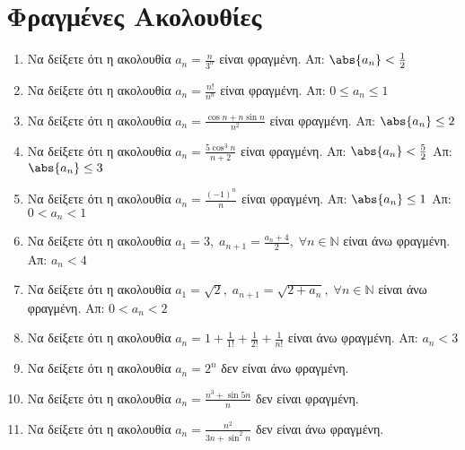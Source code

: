 


\everymath{\displaystyle}



\begin{center}
\end{center}

\vspace{\baselineskip}


\setcounter{chapter}{1}
\section{Φραγμένες Ακολουθίες}

\begin{enumerate}
    \item Να δείξετε ότι η ακολουθία $ a_{n} = \frac{n}{3^{n}} $ είναι 
        φραγμένη. 
        \hfill Απ: $ \abs{a_{n}}< \frac{1}{2} $
    \item Να δείξετε ότι η ακολουθία $ a_{n} = \frac{n!}{n^{n}} $ είναι 
        φραγμένη. 
        \hfill Απ: $ 0 \leq a_{n} \leq 1 $ 
    \item Να δείξετε ότι η ακολουθία $ a_{n} = \frac{\cos{n} + n 
        \sin{n}}{n^{2}} $ είναι φραγμένη. 
        \hfill Απ: $ \abs{a_{n}} \leq 2 $ 
    \item Να δείξετε ότι η ακολουθία $ a_{n} = \frac{5 \cos^{3}{n}}{n+2} $ 
        είναι φραγμένη.
        \hfill Απ: $ \abs{a_{n}} < \frac{5}{2}  $ 
        \hfill Απ: $ \abs{a_{n}} \leq 3 $ 
    \item Να δείξετε ότι η ακολουθία $ a_{n} = \frac{(-1)^{n}}{n} $ είναι 
        φραγμένη.
        \hfill Απ: $ \abs{a_{n}} \leq 1 $ 
        \hfill Απ: $ 0 < a_{n} < 1 $ 
    \item Να δείξετε ότι η ακολουθία $ a_{1} = 3, \; a_{n+1} =
        \frac{a_{n}+4}{2}, \; \forall n \in \mathbb{N} $ είναι άνω φραγμένη.
        \hfill Απ: $ a_{n} < 4 $ 
    \item Να δείξετε ότι η ακολουθία $ a_{1} = \sqrt{2}, \; a_{n+1} =
        \sqrt{2+ a_{n}}, \; \forall n \in \mathbb{N} $ είναι άνω φραγμένη.
        \hfill Απ: $ 0 < a_{n} < 2$ 
    \item Να δείξετε ότι η ακολουθία $ a_{n} = 1 + \frac{1}{1!} +
        \frac{1}{2!} + \frac{1}{n!} $ είναι άνω φραγμένη.
        \hfill Απ: $ a_{n} < 3 $ 
    \item Να δείξετε ότι η ακολουθία $ a_{n} = 2^{n} $ δεν είναι άνω 
        φραγμένη.
    \item Να δείξετε ότι η ακολουθία $ a_{n} = \frac{n^{3} + \sin{5n}}{n} $ δεν είναι 
        φραγμένη.
    \item Να δείξετε ότι η ακολουθία $ a_{n} = \frac{n^{2}}{3n+ \sin^{2}{n}} $ δεν 
        είναι άνω φραγμένη.
\end{enumerate}

